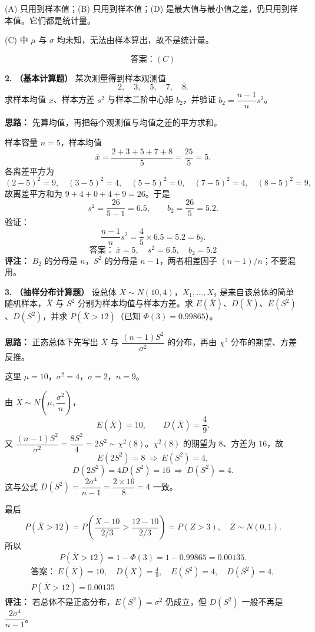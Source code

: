 (A) 只用到样本值；(B) 只用到样本值；(D) 是最大值与最小值之差，仍只用到样本值。它们都是统计量。

(C) 中 $\mu$ 与 $\sigma$ 均未知，无法由样本算出，故不是统计量。

\[
\boxed{\text{答案：}(C)}
\]
\else \answerarea \fi%

\textbf{2.} \textbf{（基本计算题）} 某次测量得到样本观测值
\[
2,\quad 3,\quad 5,\quad 7,\quad 8.
\]
求样本均值 $\overline{x}$、样本方差 $s^2$ 与样本二阶中心矩 $b_2$，并验证 $b_2=\dfrac{n-1}{n}s^2$。

\ifshowsolutions%
\textbf{思路：} 先算均值，再把每个观测值与均值之差的平方求和。

样本容量 $n=5$，样本均值
\[
\overline{x}=\frac{2+3+5+7+8}{5}=\frac{25}{5}=5.
\]
各离差平方为
\[
(2-5)^2=9,\quad (3-5)^2=4,\quad (5-5)^2=0,\quad (7-5)^2=4,\quad (8-5)^2=9,
\]
故离差平方和为 $9+4+0+4+9=26$。于是
\[
s^2=\frac{26}{5-1}=6.5,\qquad
b_2=\frac{26}{5}=5.2.
\]
验证：
\[
\frac{n-1}{n}s^2=\frac{4}{5}\times 6.5=5.2=b_2.
\]
\[
\boxed{\text{答案：}\ \overline{x}=5,\quad s^2=6.5,\quad b_2=5.2}
\]
\textbf{评注：} $B_2$ 的分母是 $n$，$S^2$ 的分母是 $n-1$，两者相差因子 $(n-1)/n$；不要混用。
\else \answerarea \fi%

\textbf{3.} \textbf{（抽样分布计算题）} 设总体 $X\sim N(10,4)$，$X_1,\ldots,X_9$ 是来自该总体的简单随机样本，$\overline{X}$ 与 $S^2$ 分别为样本均值与样本方差。求 $E(\overline{X})$、$D(\overline{X})$、$E(S^2)$、$D(S^2)$，并求 $P(\overline{X}>12)$（已知 $\Phi(3)=0.99865$）。

\ifshowsolutions%
\textbf{思路：} 正态总体下先写出 $\overline{X}$ 与 $\dfrac{(n-1)S^2}{\sigma^2}$ 的分布，再由 $\chi^2$ 分布的期望、方差反推。

这里 $\mu=10$，$\sigma^2=4$，$\sigma=2$，$n=9$。

由 $\overline{X}\sim N\!\left(\mu,\dfrac{\sigma^2}{n}\right)$，
\[
E(\overline{X})=10,\qquad D(\overline{X})=\frac{4}{9}.
\]
又 $\dfrac{(n-1)S^2}{\sigma^2}=\dfrac{8S^2}{4}=2S^2\sim\chi^2(8)$。$\chi^2(8)$ 的期望为 $8$、方差为 $16$，故
\[
E(2S^2)=8\ \Rightarrow\ E(S^2)=4,
\]
\[
D(2S^2)=4D(S^2)=16\ \Rightarrow\ D(S^2)=4.
\]
这与公式 $D(S^2)=\dfrac{2\sigma^4}{n-1}=\dfrac{2\times 16}{8}=4$ 一致。

最后
\[
P(\overline{X}>12)
=P\!\left(\frac{\overline{X}-10}{2/3}>\frac{12-10}{2/3}\right)
=P(Z>3),
\quad Z\sim N(0,1).
\]
所以
\[
P(\overline{X}>12)=1-\Phi(3)=1-0.99865=0.00135.
\]
\[
\boxed{\begin{gathered}
\text{答案：}\ E(\overline{X})=10,\quad D(\overline{X})=\frac49,\quad E(S^2)=4,\quad D(S^2)=4,\\
P(\overline{X}>12)=0.00135
\end{gathered}}
\]
\textbf{评注：} 若总体不是正态分布，$E(S^2)=\sigma^2$ 仍成立，但 $D(S^2)$ 一般不再是 $\dfrac{2\sigma^4}{n-1}$。
\else \answerarea \fi%

